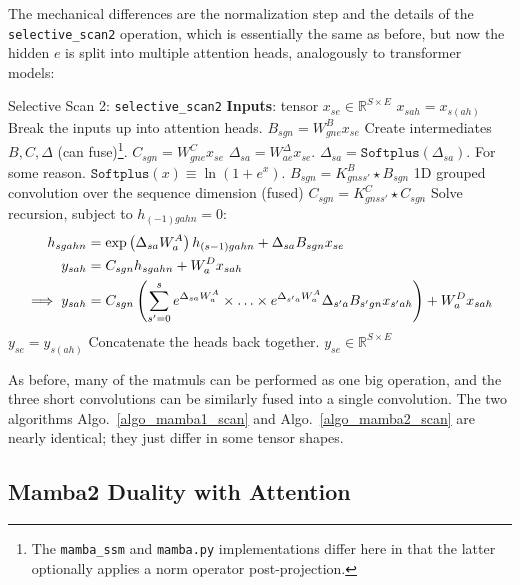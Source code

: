 The mechanical differences are the normalization step and the details of the
\texttt{selective\_scan2} operation, which is essentially the same as before, but now the hidden $ e
$ is split into multiple attention heads, analogously to transformer models:

\begin{algo}{Selective Scan 2: \texttt{selective\_scan2} }
\State \textbf{Inputs}: tensor $ x _{ se }\in \mathbb{R}^{ S\times E } $
\State $ x _{ sah } = x _{ s(ah) } $  \Comment Break the inputs up into attention heads.
\State $ B _{ sgn } = W ^{ B }_{ gne }x _{ se } $  \Comment Create intermediates $B, C, \Delta  $ (can
fuse)\footnote{The \texttt{mamba\_ssm} and \texttt{mamba.py} implementations differ here in that the
latter optionally applies a norm operator post-projection.}.
\State $ C _{ sgn } = W ^{ C }_{ gne }x _{ se } $
\State $ \Delta  _{ sa } = W ^{ \Delta   }_{ ae } x _{ se } $.
\State $ \Delta  _{ sa } = \texttt{Softplus} \left (\Delta _{ sa }\right ) $. \Comment For some reason. $ \texttt{Softplus}(x) \equiv \ln \left ( 1+ e^{ x } \right ) $.
\State $ B _{ sgn } = K ^{ B } _{ gnss' }\star B_{ sgn}$ \Comment 1D grouped convolution over the sequence dimension (fused)
\State $ C _{ sgn } = K ^{ C } _{ gnss' }\star C_{ sgn }$
\State Solve recursion, subject to $ h _{ (-1)gahn }=0 $:
\begin{align}
    h _{ sgahn } &= \exp \left ( \Delta  _{ sa } W^{A} _{ a } \right ) h _{ (s-1)gah n} + \Delta _{ sa }B _{ sgn }x _{ se }\nonumber\\
    y _{ sah } &= C _{ sgn }h _{ sgahn } +  W ^{ D } _{ a }x _{ sah } \nonumber\\
    \implies y _{ sah } &= C _{ sgn }\left (\sum _{ s'=0 }^{ s }e^{ \Delta _{ sa }W^{A} _{ a } }\times \ldots \times e^{ \Delta _{ s'a }W^{A} _{ a } } \Delta _{ s'a }B _{ s'gn } x _{ s'ah }\right ) + W ^{ D } _{ a } x _{ sah }
\end{align}
\State $ y _{ se } = y _{ s(ah) } $  \Comment Concatenate the heads back together.
\State \Return $ y _{ se } \in \mathbb{R}^{ S\times E }$
\label{algo_mamba2_scan}
\end{algo}
As before, many of the matmuls can be performed as one big operation, and the three short
convolutions can be similarly fused into a single convolution. The two algorithms
Algo.~\ref{algo_mamba1_scan} and Algo.~\ref{algo_mamba2_scan} are nearly identical; they just differ
in some tensor shapes.



\subsection{Mamba2 Duality with Attention}

